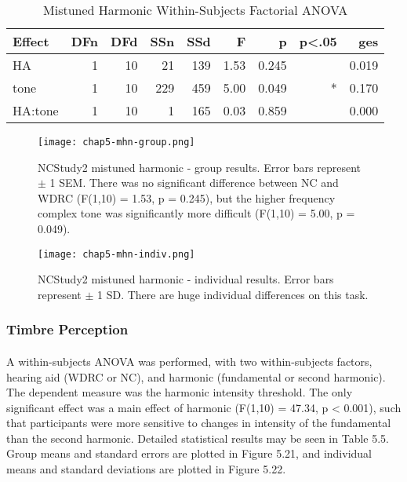 \begin{table}[htp]
\begin{center}
\begin{tabular}{lrrrrrrrr}
       Effect & DFn & DFd  &  SSn &  SSd  &    F  &     p & p<.05  &   ges \\
       \hline
          HA &  1 & 10 &  21 & 139 & 1.53 & 0.245 &      & 0.019 \\
        tone &  1 & 10 & 229 & 459 & 5.00 & 0.049 &    * & 0.170 \\
     HA:tone &  1 & 10 &   1 & 165 & 0.03 & 0.859 &      & 0.000 \\
     \hline
\end{tabular}
\end{center}
\caption{Mistuned Harmonic Within-Subjects Factorial ANOVA}
\end{table}

\begin{figure}[htp]
\begin{center}
\texttt{[image: chap5-mhn-group.png]} \\
\caption[NCStudy2 mistuned harmonic - group thresholds]{NCStudy2 mistuned harmonic - group results.  Error bars represent $\pm$ 1 SEM.  There was no significant difference between NC and WDRC (F(1,10) = 1.53, p = 0.245), but the higher frequency complex tone was significantly more difficult (F(1,10) = 5.00, p = 0.049).}
\label{chap5-mhn-group}
\end{center}
\end{figure}

\begin{figure}[htp]
\begin{center}
\texttt{[image: chap5-mhn-indiv.png]} \\
\caption[NCStudy2 mistuned harmonic - individual thresholds]{NCStudy2 mistuned harmonic - individual results.  Error bars represent $\pm$ 1 SD.  There are huge individual differences on this task.}
\label{chap5-mhn-indiv}
\end{center}
\end{figure}

\subsubsection{Timbre Perception}
\paragraph{}A within-subjects ANOVA was performed, with two within-subjects factors, hearing aid (WDRC or NC), and harmonic (fundamental or second harmonic).  The dependent measure was the harmonic intensity threshold.  The only significant effect was a main effect of harmonic (F(1,10) = 47.34, p < 0.001), such that participants were more sensitive to changes in intensity of the fundamental than the second harmonic.  Detailed statistical results may be seen in Table 5.5.  Group means and standard errors are plotted in Figure 5.21, and individual means and standard deviations are plotted in Figure 5.22.


